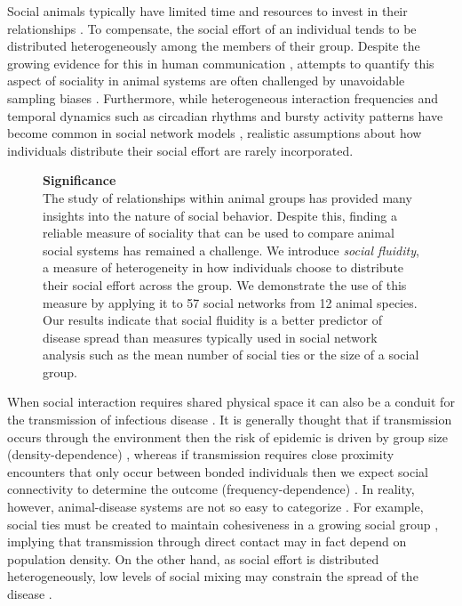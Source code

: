 \documentclass[twocolumn,8pt]{article}
\begin{document}
Social animals typically have limited time and resources to invest in their relationships \cite{SUEUR2011156}. To compensate, the social effort of an individual tends to be distributed heterogeneously among the members of their group. Despite the growing evidence for this in human communication \cite{MacCarron2016151,saramaki2014persistence,10.1371/journal.pone.0022656}, attempts to quantify this aspect of sociality in animal systems are often challenged by unavoidable sampling biases \cite{10.2307/4535790}. Furthermore, while heterogeneous interaction frequencies and temporal dynamics such as circadian rhythms and bursty activity patterns have become common in social network models \cite{Holme2015}, realistic assumptions about how individuals distribute their social effort are rarely incorporated. 

\begin{figure}[b!]
\noindent
\begin{boxedminipage}{0.49\textwidth}
{\sffamily\large\bfseries Significance }\\

{\normalsize \sffamily The study of relationships within animal groups has provided many insights into the nature of social behavior. Despite this, finding a reliable measure of sociality that can be used to compare animal social systems has remained a challenge. We introduce \emph{social fluidity}, a measure of heterogeneity in how individuals choose to distribute their social effort across the group. We demonstrate the use of this measure by applying it to 57 social networks from 12 animal species. Our results indicate that social fluidity is a better predictor of disease spread than measures typically used in social network analysis such as the mean number of social ties or the size of a social group.}
\end{boxedminipage}
\end{figure}

When social interaction requires shared physical space it can also be a conduit for the transmission of infectious disease \cite{altizer2003social}. It is generally thought that if transmission occurs through the environment then the risk of epidemic is driven by group size (density-dependence) \cite{de1995does}, whereas if transmission requires close proximity encounters that only occur between bonded individuals then we expect social connectivity to determine the outcome (frequency-dependence) \cite{doi:10.1093/biosci/biw175}. In reality, however, animal-disease systems are not so easy to categorize \cite{patterson2013parasite}. For example, social ties must be created to maintain cohesiveness in a growing social group \cite{LEHMANN20071617}, implying that transmission through direct contact may in fact depend on population density. On the other hand, as social effort is distributed heterogeneously, low levels of social mixing may constrain the spread of the disease \cite{karsai2014time}.
\end{document}
